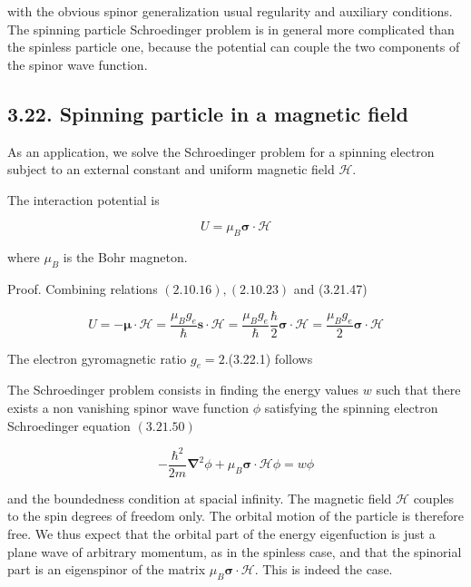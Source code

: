 \documentclass{article}
\begin{document}
with the obvious spinor generalization usual regularity and auxiliary conditions. The spinning particle Schroedinger problem is in general more complicated than the spinless particle one, because the potential can couple the two components of the spinor wave function.

\subsection*{3.22. Spinning particle in a magnetic field}

As an application, we solve the Schroedinger problem for a spinning electron subject to an external constant and uniform magnetic field $\mathcal{H}$.

The interaction potential is
 
\begin{equation*}
U=\mu_{B} \boldsymbol{\sigma} \cdot \mathcal{H} \tag{3.22.1}
\end{equation*}
 
where $\mu_{B}$ is the Bohr magneton.

Proof. Combining relations $(2.10 .16),(2.10 .23)$ and (3.21.47)
 
\begin{equation*}
U=-\boldsymbol{\mu} \cdot \mathcal{H}=\frac{\mu_{B} g_{e}}{\hbar} \boldsymbol{s} \cdot \boldsymbol{\mathcal { H }}=\frac{\mu_{B} g_{e}}{\hbar} \frac{\hbar}{2} \boldsymbol{\sigma} \cdot \boldsymbol{\mathcal { H }}=\frac{\mu_{B} g_{e}}{2} \boldsymbol{\sigma} \cdot \mathcal{H} \tag{3.22.2}
\end{equation*}
 

The electron gyromagnetic ratio $g_{e}=2$.(3.22.1) follows

The Schroedinger problem consists in finding the energy values $w$ such that there exists a non vanishing spinor wave function $\phi$ satisfying the spinning electron Schroedinger equation $(3.21 .50)$
 
\begin{equation*}
-\frac{\hbar^{2}}{2 m} \boldsymbol{\nabla}^{2} \phi+\mu_{B} \boldsymbol{\sigma} \cdot \boldsymbol{\mathcal { H }} \phi=w \phi \tag{3.22.3}
\end{equation*}
 
and the boundedness condition at spacial infinity.
The magnetic field $\mathcal{H}$ couples to the spin degrees of freedom only. The orbital motion of the particle is therefore free. We thus expect that the orbital part of the energy eigenfuction is just a plane wave of arbitrary momentum, as in the spinless case, and that the spinorial part is an eigenspinor of the matrix $\mu_{B} \boldsymbol{\sigma} \cdot \mathcal{H}$. This is indeed the case.
\end{document}
